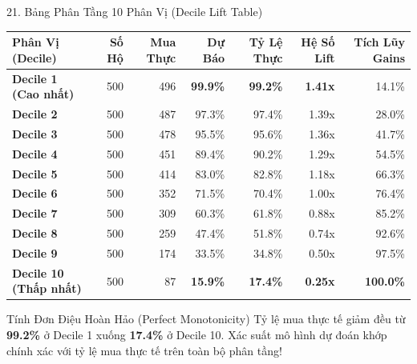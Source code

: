 \documentclass[aspectratio=169, 10pt]{beamer}
\begin{document}
\begin{frame}{21. Bảng Phân Tầng 10 Phân Vị (Decile Lift Table)}
  \centering
  \small
  \begin{tabular}{lrrrrrr}
    \toprule
    \textbf{Phân Vị (Decile)} & \textbf{Số Hộ} & \textbf{Mua Thực} & \textbf{Dự Báo} & \textbf{Tỷ Lệ Thực} & \textbf{Hệ Số Lift} & \textbf{Tích Lũy Gains} \\
    \midrule
    \textbf{Decile 1 (Cao nhất)} & 500 & 496 & \textbf{99.9\%} & \textbf{99.2\%} & \textbf{1.41x} & 14.1\% \\
    \textbf{Decile 2} & 500 & 487 & 97.3\% & 97.4\% & 1.39x & 28.0\% \\
    \textbf{Decile 3} & 500 & 478 & 95.5\% & 95.6\% & 1.36x & 41.7\% \\
    \textbf{Decile 4} & 500 & 451 & 89.4\% & 90.2\% & 1.29x & 54.5\% \\
    \textbf{Decile 5} & 500 & 414 & 83.0\% & 82.8\% & 1.18x & 66.3\% \\
    \textbf{Decile 6} & 500 & 352 & 71.5\% & 70.4\% & 1.00x & 76.4\% \\
    \textbf{Decile 7} & 500 & 309 & 60.3\% & 61.8\% & 0.88x & 85.2\% \\
    \textbf{Decile 8} & 500 & 259 & 47.4\% & 51.8\% & 0.74x & 92.6\% \\
    \textbf{Decile 9} & 500 & 174 & 33.5\% & 34.8\% & 0.50x & 97.5\% \\
    \textbf{Decile 10 (Thấp nhất)} & 500 & 87 & \textbf{15.9\%} & \textbf{17.4\%} & \textbf{0.25x} & \textbf{100.0\%} \\
    \bottomrule
  \end{tabular}
  \vspace{0.25cm}
  \begin{alertblock}{Tính Đơn Điệu Hoàn Hảo (Perfect Monotonicity)}
    Tỷ lệ mua thực tế giảm đều từ \textbf{99.2\%} ở Decile 1 xuống \textbf{17.4\%} ở Decile 10. Xác suất mô hình dự đoán khớp chính xác với tỷ lệ mua thực tế trên toàn bộ phân tầng!
  \end{alertblock}
\end{frame}
\end{document}
